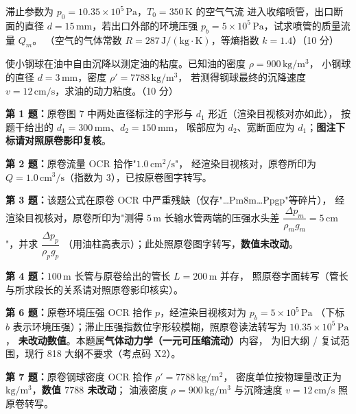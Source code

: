 \begin{ti}
  \item 滞止参数为 $p_0=10.35\times10^{5}\,\mathrm{Pa}$，$T_0=350\,\mathrm{K}$ 的空气气流
  进入收缩喷管，出口断面的直径 $d=15\,\mathrm{mm}$，若出口外部的环境压强
  $p_b=5\times10^{5}\,\mathrm{Pa}$，试求喷管的质量流量 $Q_m$。
  （空气的气体常数 $R=287\,\mathrm{J/(kg\cdot K)}$，等熵指数 $k=1.4$）（10 分）
  \hfill{}

  \item 使小钢球在油中自由沉降以测定油的粘度。已知油的密度 $\rho=900\,\mathrm{kg/m^3}$，
  小钢球的直径 $d=3\,\mathrm{mm}$，密度 $\rho'=7788\,\mathrm{kg/m^3}$，
  若测得钢球最终的沉降速度 $v=12\,\mathrm{cm/s}$，求油的动力粘度。（10 分）
  \hfill{}
\end{ti}

\begin{tishi}
\textbf{第 1 题：}原卷图 7 中两处直径标注的字形与 $d_1$ 形近（渲染目视核对亦如此），
按题干给出的 $d_1=300\,\mathrm{mm}$、$d_2=150\,\mathrm{mm}$，
喉部应为 $d_2$、宽断面应为 $d_1$；\textbf{图注下标请对照原卷影印复核}。

\textbf{第 2 题：}原卷流量 OCR 拾作"$1.0\,\mathrm{cm^2/s}$"，
经渲染目视核对，原卷所印为 $Q=1.0\,\mathrm{cm^3/s}$（指数为 3），已按原卷图字转写。

\textbf{第 3 题：}该题公式在原卷 OCR 中严重残缺（仅存"\dots Pm8m\dots Ppgp"等碎片），
经渲染目视核对，原卷所印为"测得 $5\,\mathrm{m}$ 长输水管两端的压强水头差
$\dfrac{\Delta p_m}{\rho_m g_m}=5\,\mathrm{cm}$"，并求 $\dfrac{\Delta p_p}{\rho_p g_p}$
（用油柱高表示）；此处照原卷图字转写，\textbf{数值未改动}。

\textbf{第 4 题：}$100\,\mathrm{m}$ 长管与原卷给出的管长 $L=200\,\mathrm{m}$ 并存，
照原卷字面转写（管长与所求段长的关系请对照原卷影印核实）。

\textbf{第 6 题：}原卷环境压强 OCR 拾作 $p$，经渲染目视核对为 $p_b=5\times10^{5}\,\mathrm{Pa}$
（下标 $b$ 表示环境压强）；滞止压强指数位字形较模糊，照原卷读法转写为 $10.35\times10^{5}\,\mathrm{Pa}$，
\textbf{未改动数值}。本题属\textbf{气体动力学（一元可压缩流动）}内容，
为旧大纲 / 复试范围，现行 818 大纲不要求（考点码 X2）。

\textbf{第 7 题：}原卷钢球密度 OCR 拾作 $\rho'=7788\,\mathrm{kg/m^2}$，
密度单位按物理量改正为 $\mathrm{kg/m^3}$，\textbf{数值 $7788$ 未改动}；
油液密度 $\rho=900\,\mathrm{kg/m^3}$ 与沉降速度 $v=12\,\mathrm{cm/s}$ 照原卷转写。
\end{tishi}
